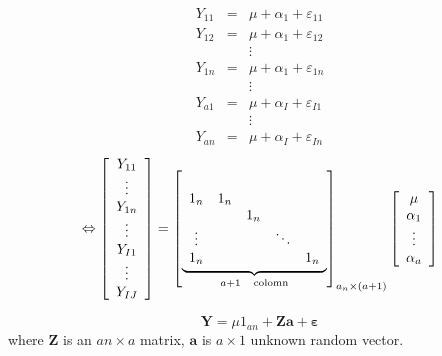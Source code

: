 \documentclass{article}
\begin{document}
\begin{eqnarray*}
Y_{11} &=&\mu +\alpha _{1}+\varepsilon _{11} \\
Y_{12} &=&\mu +\alpha _{1}+\varepsilon _{12} \\
&&\vdots \\
Y_{1n} &=&\mu +\alpha _{1}+\varepsilon _{1n} \\
&&\vdots \\
Y_{a1} &=&\mu +\alpha _{I}+\varepsilon _{I1} \\
&&\vdots \\
Y_{an} &=&\mu +\alpha _{I}+\varepsilon _{In}
\end{eqnarray*}%
\begin{equation*}
\Leftrightarrow \left[ 
\begin{array}{c}
Y_{11} \\ 
\vdots \\ 
Y_{1n} \\ 
\vdots \\ 
Y_{I1} \\ 
\vdots \\ 
Y_{IJ}%
\end{array}%
\right] =\left[ \underset{a+1\text{ colomn}}{\underbrace{%
\begin{array}{ccccc}
1_{n} & 1_{n} &  &  &  \\ 
&  & 1_{n} &  &  \\ 
\vdots &  &  & \ddots &  \\ 
1_{n} &  &  &  & 1_{n}%
\end{array}%
}}\right] _{a_{n}\times \left( a+1\right) }\left[ 
\begin{array}{c}
\mu \\ 
\alpha _{1} \\ 
\vdots \\ 
\alpha _{a}%
\end{array}%
\right]
\end{equation*}

\bigskip

\begin{equation*}
\mathbf{Y}=\mu 1_{an}+\mathbf{Za+\varepsilon }
\end{equation*}%
where $\mathbf{Z}$ is an $an\times a$ matrix, $\mathbf{a}$ is $a\times 1$
unknown random vector.

\bigskip
\end{document}
